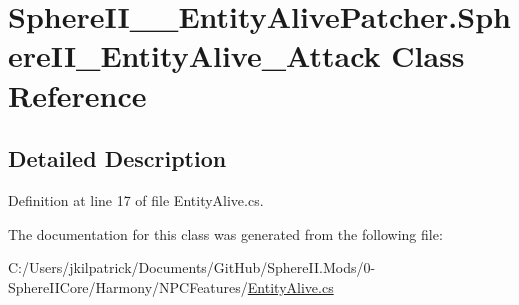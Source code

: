 \hypertarget{class_sphere_i_i_____entity_alive_patcher_1_1_sphere_i_i___entity_alive___attack}{}\section{Sphere\+I\+I\+\_\+\+\_\+\+Entity\+Alive\+Patcher.\+Sphere\+I\+I\+\_\+\+Entity\+Alive\+\_\+\+Attack Class Reference}
\label{class_sphere_i_i_____entity_alive_patcher_1_1_sphere_i_i___entity_alive___attack}


\subsection{Detailed Description}


Definition at line 17 of file Entity\+Alive.\+cs.



The documentation for this class was generated from the following file\+:\begin{DoxyCompactItemize}
\item 
C\+:/\+Users/jkilpatrick/\+Documents/\+Git\+Hub/\+Sphere\+I\+I.\+Mods/0-\/\+Sphere\+I\+I\+Core/\+Harmony/\+N\+P\+C\+Features/\mbox{\hyperlink{_entity_alive_8cs}{Entity\+Alive.\+cs}}\end{DoxyCompactItemize}
